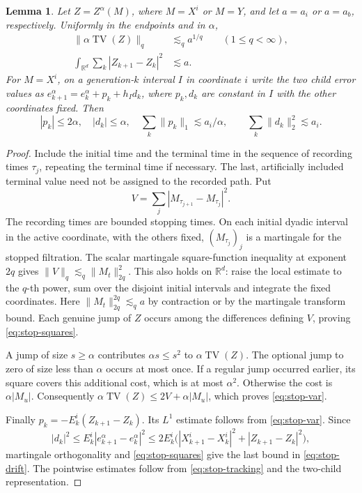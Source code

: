 \documentclass[11pt]{article}
\newtheorem{lemma}[theorem]{Lemma}
\newcommand{\R}{\mathbb R}
\newcommand{\anorm}[1]{\lVert #1\rVert}
\begin{document}
\begin{lemma}\label{lem:stop-var}
Let \(Z=Z^\alpha(M)\), where \(M=X^i\) or \(M=Y\), and let \(a=a_i\)
or \(a=a_b\), respectively. Uniformly in the endpoints and in \(\alpha\),
\begin{align}
 \anorm{\alpha\operatorname{TV}(Z)}_q
        &\lesssim_q a^{1/q}\qquad(1\le q<\infty),\label{eq:stop-var}\\
 \int_{\R^d}\sum_k|Z_{k+1}-Z_k|^2&\lesssim a .\label{eq:stop-squares}
\end{align}
For \(M=X^i\), on a generation-\(k\) interval \(I\) in coordinate \(i\)
write the two child error values as
\(e^\alpha_{k+1}=e^\alpha_k+p_k+h_I d_k\), where \(p_k,d_k\) are
constant in \(I\) with the other coordinates fixed. Then
\begin{equation}\label{eq:stop-drift}
 |p_k|\le2\alpha,\quad |d_k|\le\alpha,\quad
 \sum_k\anorm{p_k}_1\lesssim a_i/\alpha,\qquad
 \sum_k\anorm{d_k}_2^2\lesssim a_i .
\end{equation}
\end{lemma}
\begin{proof}
Include the initial time and the terminal time in the sequence of
recording times \(\tau_j\), repeating the terminal time if necessary.
The last, artificially included terminal value need not be assigned to
the recorded path. Put
\[
                V=\sum_j|M_{\tau_{j+1}}-M_{\tau_j}|^2 .
\]
The recording times are bounded stopping times. On each initial dyadic
interval in the active coordinate, with the others fixed,
\((M_{\tau_j})_j\) is a martingale for the stopped filtration. The
scalar martingale square-function inequality at exponent \(2q\) gives
\(\anorm{V}_q\lesssim_q\anorm{M_t}_{2q}^2\). This also holds on
\(\R^d\): raise the local estimate to the \(q\)-th power, sum over
the disjoint initial intervals and integrate the fixed coordinates.
Here \(\anorm{M_t}_{2q}^{2q}\lesssim_q a\) by contraction or by the
martingale transform bound. Each genuine jump of \(Z\) occurs among
the differences defining \(V\), proving \eqref{eq:stop-squares}.

A jump of size \(s\ge\alpha\) contributes \(\alpha s\le s^2\) to
\(\alpha\operatorname{TV}(Z)\). The optional jump to zero of size
less than \(\alpha\) occurs at most once. If a regular jump occurred
earlier, its square covers this additional cost, which is at most
\(\alpha^2\). Otherwise the cost is \(\alpha|M_u|\). Consequently
\(\alpha\operatorname{TV}(Z)\le2V+\alpha|M_u|\), which proves
\eqref{eq:stop-var}.

Finally \(p_k=-E_k^i(Z_{k+1}-Z_k)\). Its \(L^1\) estimate follows
from \eqref{eq:stop-var}. Since
\[
 |d_k|^2\le E_k^i|e^\alpha_{k+1}-e^\alpha_k|^2
 \le 2E_k^i\bigl(|X^i_{k+1}-X^i_k|^2+|Z_{k+1}-Z_k|^2\bigr),
\]
martingale orthogonality and \eqref{eq:stop-squares} give the last
bound in \eqref{eq:stop-drift}. The pointwise estimates follow from
\eqref{eq:stop-tracking} and the two-child representation.
\end{proof}
\end{document}
